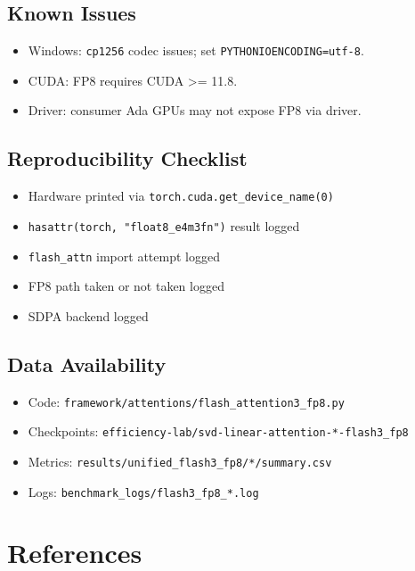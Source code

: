 \subsection{Known Issues}

\begin{itemize}
\item Windows: \texttt{cp1256} codec issues; set \texttt{PYTHONIOENCODING=utf-8}.
\item CUDA: FP8 requires CUDA \textgreater{}= 11.8.
\item Driver: consumer Ada GPUs may not expose FP8 via driver.

\end{itemize}
\subsection{Reproducibility Checklist}

\begin{itemize}
\item [x] Hardware printed via \texttt{torch.cuda.get\_device\_name(0)}
\item [x] \texttt{hasattr(torch, "float8\_e4m3fn")} result logged
\item [x] \texttt{flash\_attn} import attempt logged
\item [x] FP8 path taken or not taken logged
\item [x] SDPA backend logged

\end{itemize}
\subsection{Data Availability}

\begin{itemize}
\item Code: \texttt{framework/attentions/flash\_attention3\_fp8.py}
\item Checkpoints: \texttt{efficiency-lab/svd-linear-attention-*-flash3\_fp8}
\item Metrics: \texttt{results/unified\_flash3\_fp8/*/summary.csv}
\item Logs: \texttt{benchmark\_logs/flash3\_fp8\_*.log}

\end{itemize}



\section{References}

